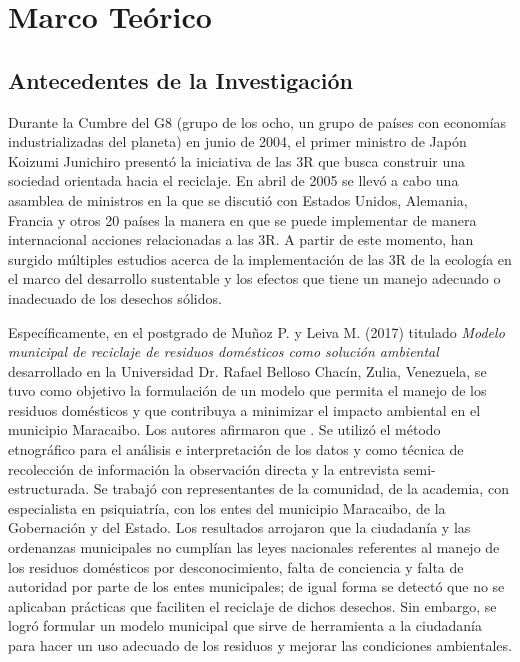 \vspace*{6cm}
\chapter{Marco Teórico}
\newpage

\section{Antecedentes de la Investigación}

Durante la Cumbre del G8 (grupo de los ocho, un grupo de países con economías industrializadas del planeta) en junio de 2004, el primer ministro de Japón Koizumi Junichiro presentó la iniciativa de las 3R que busca construir una sociedad orientada hacia el reciclaje. En abril de 2005 se llevó a cabo una asamblea de ministros en la que se discutió con Estados Unidos, Alemania, Francia y otros 20 países la manera en que se puede implementar de manera internacional acciones relacionadas a las 3R. A partir de este momento, han surgido múltiples estudios acerca de la implementación de las 3R de la ecología en el marco del desarrollo sustentable y los efectos que tiene un manejo adecuado o inadecuado de los desechos sólidos.

Específicamente, en el postgrado de Muñoz P. y Leiva M. (2017) titulado \textit{Modelo municipal de reciclaje de residuos domésticos como solución ambiental} desarrollado en la Universidad Dr. Rafael Belloso Chacín, Zulia, Venezuela, se tuvo como objetivo la formulación de un modelo que permita el manejo de los residuos domésticos y que contribuya a minimizar el impacto ambiental en el municipio Maracaibo. Los autores afirmaron que . Se utilizó el método etnográfico para el análisis e interpretación de los datos y como técnica de recolección de información la observación directa y la entrevista semi-estructurada. Se trabajó con representantes de la comunidad, de la academia, con especialista en psiquiatría, con los entes del municipio Maracaibo, de la Gobernación y del Estado. Los resultados arrojaron que la ciudadanía y las ordenanzas municipales no cumplían las leyes nacionales referentes al manejo de los residuos domésticos por desconocimiento, falta de conciencia y falta de autoridad por parte de los entes municipales; de igual forma se detectó que no se aplicaban prácticas que faciliten el reciclaje de dichos desechos. Sin embargo, se logró formular un modelo municipal que sirve de herramienta a la ciudadanía para hacer un uso adecuado de los residuos y mejorar las condiciones ambientales.

